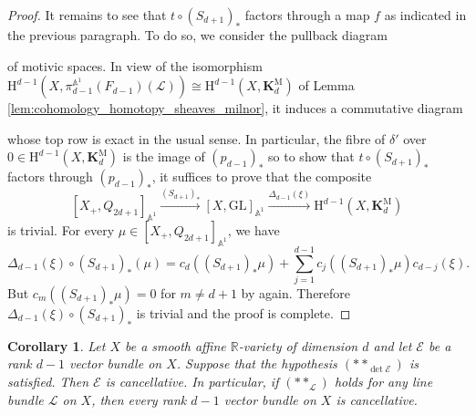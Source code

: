 \documentclass[11pt,leqno]{amsart}
\newcommand{\Esc}{{\mathscr{E}}}
\newcommand{\GL}{{\mathrm{GL}}}
\renewcommand{\1}{{\rm 1\hspace*{-0.4ex}%
\rule{0.1ex}{1.52ex}\hspace*{0.2ex}}}
\renewcommand{\Lc}{{\mathcal L}}
\newcommand{\Hr}{{\mathrm {H}}}
\newcommand{\<}[1]{{\langle}#1 {\rangle}}
\newcommand{\Rb}{\mathbb{R}}
\newcommand{\Kr}{\mathrm{K}}
\newcommand{\Kbf}{\mathbf{K}}
\newcommand{\Abb}{\mathbb{A}}
\newcommand{\BGL}{\operatorname{BGL}}
\newcommand{\Mr}{\mathrm{M}}
\newcommand{\Br}{\mathrm{B}}
\newcommand{\Map}{\operatorname{Map}}
\theoremstyle{plain}
\newtheorem{cor}[thm]{Corollary}
\theoremstyle{definition}
\theoremstyle{remark}
\numberwithin{equation}{section}
\begin{document}
\begin{proof}
It remains to see that $t\circ(S_{d+1})_*$ factors through a map $f$ as indicated in the previous paragraph. To do so, we consider the pullback diagram
\begin{center}
\end{center}
of motivic spaces. In view of the isomorphism $\Hr^{d-1}(X,\pi_{d-1}^{\Abb^1}(F_{d-1})(\Lc))\cong\Hr^{d-1}(X,\Kbf_d^\Mr)$ of Lemma \ref{lem:cohomology_homotopy_sheaves_milnor}, it induces a commutative diagram
\begin{center}
\end{center}
whose top row is exact in the usual sense.  In particular, the fibre of $\delta'$ over $0\in\Hr^{d-1}(X,\Kbf_d^\Mr)$ is the image of $(p_{d-1})_*$ so to show that $t\circ(S_{d+1})_*$ factors through $(p_{d-1})_*$, it suffices to prove that the composite \[[X_+,Q_{2d+1}]_{\Abb^1}\xrightarrow{(S_{d+1})_*}[X,\GL]_{\Abb^1}\xrightarrow{\Delta_{d-1}(\xi)}\Hr^{d-1}(X,\Kbf_d^\Mr)\] is trivial. For every $\mu\in[X_+,Q_{2d+1}]_{\Abb^1}$, we have \[\Delta_{d-1}(\xi)\circ(S_{d+1})_*(\mu)=c_d((S_{d+1})_*\mu)+\sum_{j=1}^{d-1}c_j((S_{d+1})_*\mu)c_{d-j}(\xi).\] But $c_m((S_{d+1})_*\mu)=0$ for $m\neq d+1$ by \cite[Proposition 6.9, Remark 6.10]{duEnumeratingNonStableVector2022} again. Therefore $\Delta_{d-1}(\xi)\circ(S_{d+1})_*$ is trivial and the proof is complete.
\end{proof}

\begin{cor}\label{cor:cancellability_corank_1}
Let $X$ be a smooth affine $\Rb$-variety of dimension $d$ and let $\Esc$ be a rank $d-1$ vector bundle on $X$. Suppose that the hypothesis $(**_{\det\Esc})$ is satisfied. Then $\Esc$ is cancellative. In particular, if $(**_\Lc)$ holds for any line bundle $\Lc$ on $X$, then every rank $d-1$ vector bundle on $X$ is cancellative.
\end{cor}
\end{document}
